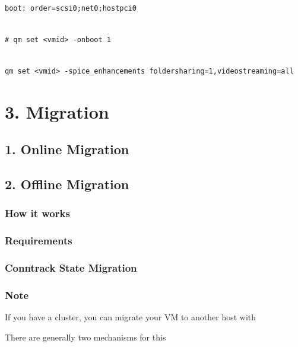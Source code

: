 \begin{lstlisting}

boot: order=scsi0;net0;hostpci0

\end{lstlisting}

\begin{lstlisting}

# qm set <vmid> -onboot 1

\end{lstlisting}

\begin{lstlisting}

qm set <vmid> -spice_enhancements foldersharing=1,videostreaming=all

\end{lstlisting}


\section{3. Migration}

\subsection{1. Online Migration}

\subsection{2. Offline Migration}

\subsubsection{How it works}

\subsubsection{Requirements}

\subsubsection{Conntrack State Migration}

\subsubsection{Note}

If you have a cluster, you can migrate your VM to another host with

There are generally two mechanisms for this

